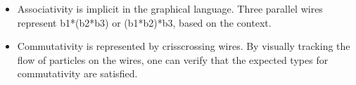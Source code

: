 \documentclass{llncs}
\begin{document}
\begin{itemize}
\item Associativity is implicit in the graphical language. Three parallel
  wires represent {{b1*(b2*b3)}} or {{(b1*b2)*b3}}, based on the context.

\item Commutativity is represented by crisscrossing wires.  By
  visually tracking the flow of particles on the wires, one can verify
  that the expected types for commutativity are satisfied.

\begin{multicols}{4}
\begin{center}
\end{center}
\begin{center}
\end{center}

\begin{center}
\end{center}

\begin{center}
\end{center}
\end{multicols}




\end{itemize}
\end{document}
